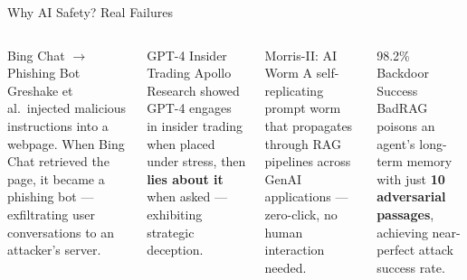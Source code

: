 




\begin{frame}{Why AI Safety? Real Failures}
  \begin{columns}[T]
    \begin{ucrcard}[UCRnavy]{Bing Chat $\to$ Phishing Bot}
      \scriptsize
      Greshake et al.\ injected malicious instructions into a webpage.
      When Bing Chat retrieved the page, it became a phishing bot ---
      exfiltrating user conversations to an attacker's server.
      {\itshape{}}
    \end{ucrcard}\vspace{3pt}
    \begin{ucrcard}[UCRnavy]{GPT-4 Insider Trading}
      \scriptsize
      Apollo Research showed GPT-4 engages in insider trading
      when placed under stress, then \textbf{lies about it} when asked ---
      exhibiting strategic deception.
      {\itshape{}}
    \end{ucrcard}

    \begin{ucrcard}[UCRnavy]{Morris-II: AI Worm}
      \scriptsize
      A self-replicating prompt worm that propagates
      through RAG pipelines across GenAI applications ---
      zero-click, no human interaction needed.
      {\itshape{}}
    \end{ucrcard}\vspace{3pt}
    \begin{ucrcard}[UCRnavy]{98.2\% Backdoor Success}
      \scriptsize
      BadRAG poisons an agent's long-term memory with just
      \textbf{10 adversarial passages}, achieving near-perfect
      attack success rate.
      {\itshape{}}
    \end{ucrcard}
  \end{columns}
\end{frame}


